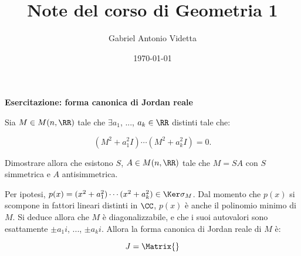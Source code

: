 \documentclass[11pt]{article}
\title{\textbf{Note del corso di Geometria 1}}
\author{Gabriel Antonio Videtta}
\date{\today}
\begin{document}
	
	\maketitle
	
	\begin{center}
		\Large \textbf{Esercitazione: forma canonica di Jordan reale}
	\end{center}

	\wip

	\begin{exercise}
		Sia $M \in M(n, \RR)$ tale che $\exists a_1$, ..., $a_k \in \RR$ distinti
		tale che:
		
		\[ (M^2 + a_1^2 I) \cdots (M^2 + a_k^2 I) = 0. \]
		
		Dimostrare allora che esistono $S$, $A \in M(n, \RR)$ tale che
		$M = SA$ con $S$ simmetrica e $A$ antisimmetrica.
	\end{exercise}

	\begin{solution}
		Per ipotesi, $p(x) = (x^2+a_1^2) \cdots (x^2 + a_k^2) \in \Ker \sigma_M$.
		Dal momento che $p(x)$ si scompone in fattori lineari distinti in
		$\CC$, $p(x)$ è anche il polinomio minimo di $M$. Si deduce
		allora che $M$ è diagonalizzabile, e che i suoi autovalori sono
		esattamente $\pm a_1 i$, ..., $\pm a_k i$. Allora la forma
		canonica di Jordan reale di $M$ è:
		
		\[ J = \Matrix{} \]
	\end{solution}
\end{document}
